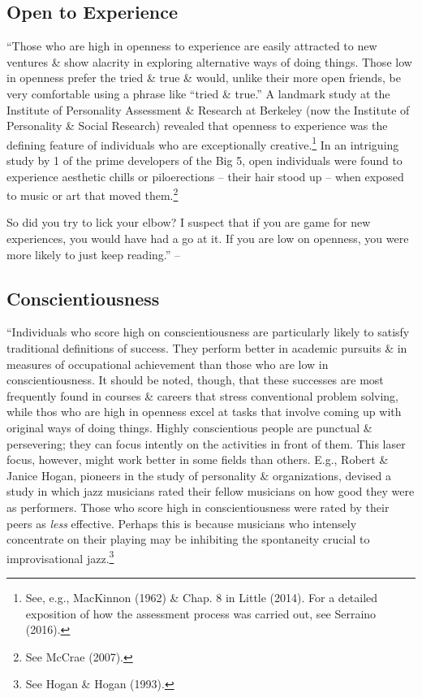 \documentclass{article}
\numberwithin{equation}{section}
\begin{document}
\subsection{Open to Experience}
``Those who are high in openness to experience are easily attracted to new ventures \& show alacrity in exploring alternative ways of doing things. Those low in openness prefer the tried \& true \& would, unlike their more open friends, be very comfortable using a phrase like ``tried \& true.'' A landmark study at the Institute of Personality Assessment \& Research at Berkeley (now the Institute of Personality \& Social Research) revealed that openness to experience was the defining feature of individuals who are exceptionally creative.\footnote{See, e.g., MacKinnon (1962) \& Chap. 8 in Little (2014). For a detailed exposition of how the assessment process was carried out, see Serraino (2016).} In an intriguing study by 1 of the prime developers of the Big 5, open individuals were found to experience aesthetic chills or piloerections -- their hair stood up -- when exposed to music or art that moved them.\footnote{See McCrae (2007).}

So did you try to lick your elbow? I suspect that if you are game for new experiences, you would have had a go at it. If you are low on openness, you were more likely to just keep reading.'' -- \cite[pp. 16--17]{Little2017}

\subsection{Conscientiousness}
``Individuals who score high on conscientiousness are particularly likely to satisfy traditional definitions of success. They perform better in academic pursuits \& in measures of occupational achievement than those who are low in conscientiousness. It should be noted, though, that these successes are most frequently found in courses \& careers that stress conventional problem solving, while thos who are high in openness excel at tasks that involve coming up with original ways of doing things. Highly conscientious people are punctual \& persevering; they can focus intently on the activities in front of them. This laser focus, however, might work better in some fields than others. E.g., Robert \& Janice Hogan, pioneers in the study of personality \& organizations, devised a study in which jazz musicians rated their fellow musicians on how good they were as performers. Those who score high in conscientiousness were rated by their peers as \textit{less} effective. Perhaps this is because musicians who intensely concentrate on their playing may be inhibiting the spontaneity crucial to improvisational jazz.\footnote{See Hogan \& Hogan (1993).}
\end{document}
